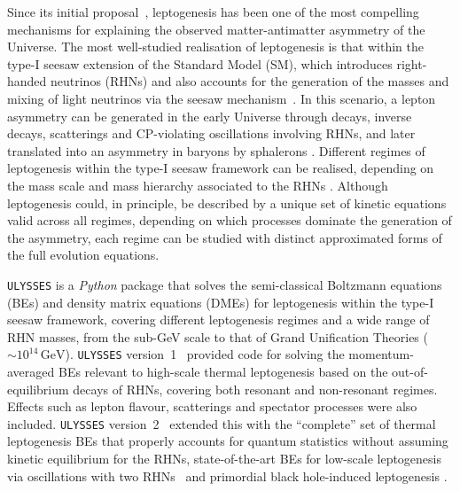 \documentclass[12pt, a4paper]{article}
\newcommand{\virg}[1]{``#1''}
\begin{document}
Since its initial proposal~\cite{Fukugita:1986hr}, leptogenesis has been one of the most compelling
mechanisms for explaining the observed matter-antimatter asymmetry of the
Universe. The most well-studied realisation of leptogenesis is that within the type-I seesaw extension of the Standard Model (SM), which introduces right-handed neutrinos (RHNs) and also accounts for the generation of the masses and mixing of light neutrinos via the seesaw mechanism~\cite{Minkowski:1977sc, Yanagida:1979as, GellMann:1980vs, Glashow:1979nm, Mohapatra:1979ia}. In this scenario, a lepton asymmetry can be generated in the early Universe through decays, inverse decays, scatterings and CP-violating
oscillations involving RHNs, and later translated into an asymmetry in baryons by sphalerons \cite{Kuzmin:1985mm, DOnofrio:2014rug}. Different regimes of leptogenesis within the type-I seesaw framework can be realised,
depending on the mass scale and mass hierarchy associated to the RHNs \cite{Pilaftsis:1997jf, Pilaftsis:2003gt, Akhmedov:1998qx, Asaka:2005pn, Racker:2012vw}. Although leptogenesis could, in principle, be described by a unique set of kinetic equations valid across all regimes, depending on which processes dominate the generation of the asymmetry, each regime can be studied with distinct approximated forms of the full evolution equations.

\texttt{ULYSSES}
\cite{Granelli:2020pim, Granelli:2023vcm} is a \textit{Python} package that solves the
semi-classical Boltzmann equations (BEs) and density matrix equations (DMEs) for
leptogenesis within the type-I seesaw framework, covering different leptogenesis regimes and a wide range of RHN masses, from the sub-GeV scale to that of Grand Unification Theories ($\sim 10^{14}\,\text{GeV}$).
\texttt{ULYSSES} version~1~\cite{Granelli:2020pim} provided code for solving the
momentum-averaged BEs relevant to high-scale thermal leptogenesis based on the out-of-equilibrium
decays of RHNs, covering both resonant and non-resonant
regimes. Effects such as lepton flavour, scatterings and spectator processes were also
included. \texttt{ULYSSES} version~2~\cite{Granelli:2023vcm} extended this with the
\virg{complete} set of thermal leptogenesis BEs that properly accounts for quantum statistics
without assuming kinetic equilibrium for the RHNs, state-of-the-art BEs for low-scale
leptogenesis via oscillations with two RHNs~\cite{Asaka:2005pn,Akhmedov:1998qx} and primordial black hole-induced leptogenesis \cite{Perez-Gonzalez:2020vnz,Bernal:2022pue,Gunn:2024xaq}.
\end{document}
